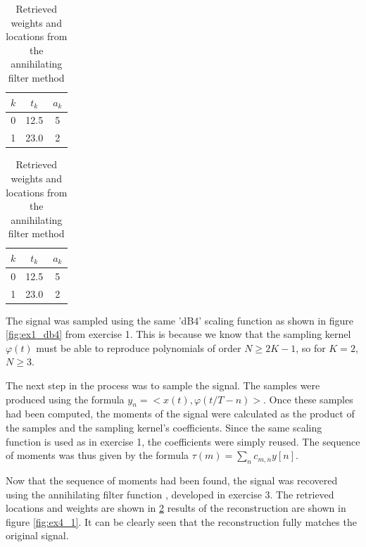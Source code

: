 \documentclass[a4paper]{article}
\begin{document}
\begin{table}[H]
    \parbox{.45\linewidth}{
    \centering
    \begin{tabular}{|c|c|c|}
        \hline
        $k$     & $t_k$     & $a_k$ \\ \hline
        0       & 12.5   & 5\\ \hline
        1       & 23.0   & 2\\ \hline
    \end{tabular}
    \caption{Original weights and locations of $x(t)$}
    \label{tab:ex4_1}
    }
    \hfill
    \parbox{.45\linewidth}{
    \centering
    \begin{tabular}{|c|c|c|}
        \hline
        $k$     & $t_k$     & $a_k$ \\ \hline
         0       & 12.5   & 5\\ \hline
        1       & 23.0   & 2\\ \hline
    \end{tabular}
    \caption{Retrieved weights and locations from the annihilating filter method}
    \label{tab:ex4_2}
    }
\end{table}


The signal was sampled using the same 'dB4' scaling function as shown in figure \ref{fig:ex1_db4} from exercise 1. This is because we know that the sampling kernel $\varphi(t)$ must be able to reproduce polynomials of order $N \geq 2K-1$, so for $K=2$, $N\geq 3$.

The next step in the process was to sample the signal. The samples were produced using the formula $y_n = <x(t),\varphi(t/T-n)>$. Once these samples had been computed, the moments of the signal were calculated as the product of the samples and the sampling kernel's coefficients. Since the same scaling function is used as in exercise 1, the coefficients were simply reused. The sequence of moments was thus given by the formula $\tau(m)=\sum_nc_{m,n}y[n]$.

Now that the sequence of moments had been found, the signal was recovered using the annihilating filter function , developed in exercise 3. The retrieved locations and weights are shown in \ref{tab:ex4_2} results of the reconstruction are shown in figure \ref{fig:ex4_1}. It can be clearly seen that the reconstruction fully matches the original signal.
\end{document}
